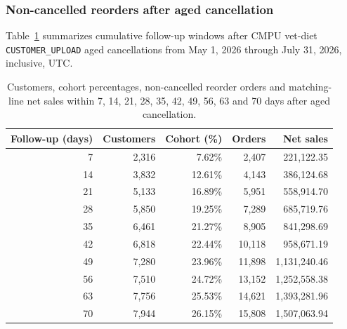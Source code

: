 \clearpage
\subsubsection{Non-cancelled reorders after aged cancellation}
Table~\ref{tab:financial-opportunity-reorder-windows} summarizes cumulative
follow-up windows after CMPU vet-diet \texttt{CUSTOMER\_UPLOAD} aged cancellations
from May 1, 2026 through July 31, 2026, inclusive, UTC.

\begin{table}[!htbp]
\centering
\caption{Customers, cohort percentages, non-cancelled reorder orders and matching-line net sales within 7, 14, 21, 28, 35, 42, 49, 56, 63 and 70 days after aged cancellation.}
\label{tab:financial-opportunity-reorder-windows}
\begin{tabular}{@{}rrrrr@{}}
\toprule
Follow-up (days) & Customers & Cohort (\%) & Orders & Net sales \\
\midrule
7 & 2,316 & 7.62\% & 2,407 & 221,122.35 \\
14 & 3,832 & 12.61\% & 4,143 & 386,124.68 \\
21 & 5,133 & 16.89\% & 5,951 & 558,914.70 \\
28 & 5,850 & 19.25\% & 7,289 & 685,719.76 \\
35 & 6,461 & 21.27\% & 8,905 & 841,298.69 \\
42 & 6,818 & 22.44\% & 10,118 & 958,671.19 \\
49 & 7,280 & 23.96\% & 11,898 & 1,131,240.46 \\
56 & 7,510 & 24.72\% & 13,152 & 1,252,558.38 \\
63 & 7,756 & 25.53\% & 14,621 & 1,393,281.96 \\
70 & 7,944 & 26.15\% & 15,808 & 1,507,063.94 \\
\bottomrule
\end{tabular}


\end{table}
